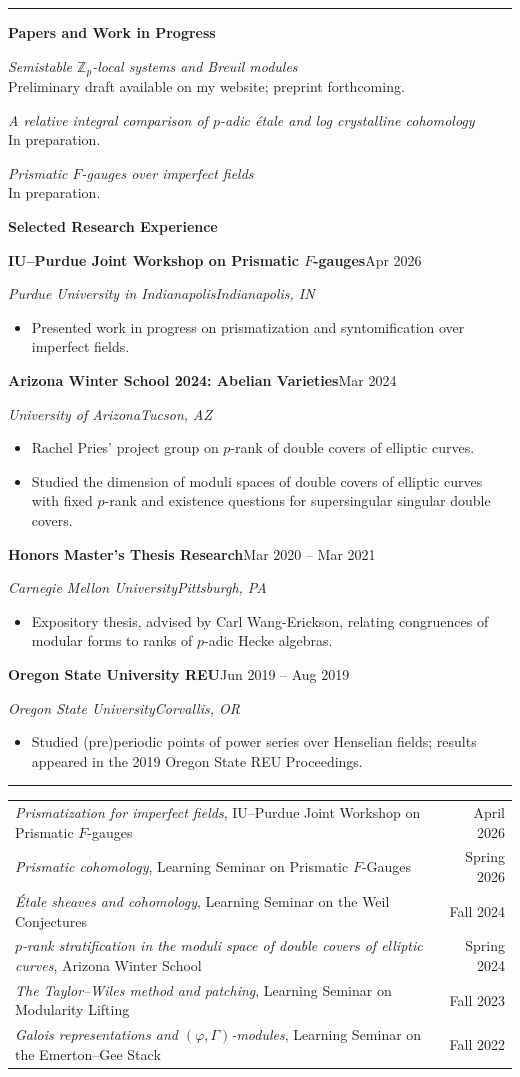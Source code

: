 \documentclass[11pt,letterpaper]{article}
\newcommand{\cvsection}[1]{\par\vspace{9pt}{\itshape #1}\par\vspace{1pt}\hrule\vspace{4pt}}
\newcommand{\entry}[4]{\par\vspace{4pt}\hspace*{10pt}\begin{minipage}{\dimexpr\linewidth-10pt}\textbf{#1}\hfill #2\par{\small\itshape #3\hfill #4}\end{minipage}\par}
\newcommand{\detail}[1]{\hspace*{10pt}\begin{minipage}{\dimexpr\linewidth-10pt}\small #1\end{minipage}\par}
\newcommand{\talk}[3]{\textit{#1}, #2 & #3\\[2pt]}
\begin{document}
\cvsection{Research}
\textbf{Papers and Work in Progress}\par
\detail{\textit{Semistable $\mathbb{Z}_p$-local systems and Breuil modules}\\
Preliminary draft available on my website; preprint forthcoming.}
\vspace{3pt}
\detail{\textit{A relative integral comparison of $p$-adic \'etale and log crystalline cohomology}\\
In preparation.}
\vspace{3pt}
\detail{\textit{Prismatic $F$-gauges over imperfect fields}\\
In preparation.}
\vspace{5pt}
\textbf{Selected Research Experience}
\entry{IU--Purdue Joint Workshop on Prismatic $F$-gauges}{Apr 2026}{Purdue University in Indianapolis}{Indianapolis, IN}
\begin{itemize}\small
\item Presented work in progress on prismatization and syntomification over imperfect fields.
\end{itemize}
\entry{Arizona Winter School 2024: Abelian Varieties}{Mar 2024}{University of Arizona}{Tucson, AZ}
\begin{itemize}\small
\item Rachel Pries' project group on $p$-rank of double covers of elliptic curves.
\item Studied the dimension of moduli spaces of double covers of elliptic curves with fixed $p$-rank and existence questions for supersingular singular double covers.
\end{itemize}
\entry{Honors Master's Thesis Research}{Mar 2020 -- Mar 2021}{Carnegie Mellon University}{Pittsburgh, PA}
\begin{itemize}\small
\item Expository thesis, advised by Carl Wang-Erickson, relating congruences of modular forms to ranks of $p$-adic Hecke algebras.
\end{itemize}
\entry{Oregon State University REU}{Jun 2019 -- Aug 2019}{Oregon State University}{Corvallis, OR}
\begin{itemize}\small
\item Studied (pre)periodic points of power series over Henselian fields; results appeared in the 2019 Oregon State REU Proceedings.
\end{itemize}

\cvsection{Selected Seminar Talks}
{\small\begin{tabularx}{\linewidth}{@{}>{\raggedright\arraybackslash}X r@{}}
\talk{Prismatization for imperfect fields}{IU--Purdue Joint Workshop on Prismatic $F$-gauges}{April 2026}
\talk{Prismatic cohomology}{Learning Seminar on Prismatic $F$-Gauges}{Spring 2026}
\talk{\'Etale sheaves and cohomology}{Learning Seminar on the Weil Conjectures}{Fall 2024}
\talk{$p$-rank stratification in the moduli space of double covers of elliptic curves}{Arizona Winter School}{Spring 2024}
\talk{The Taylor--Wiles method and patching}{Learning Seminar on Modularity Lifting}{Fall 2023}
\talk{Galois representations and $(\varphi,\Gamma)$-modules}{Learning Seminar on the Emerton--Gee Stack}{Fall 2022}
\end{tabularx}}
\end{document}
